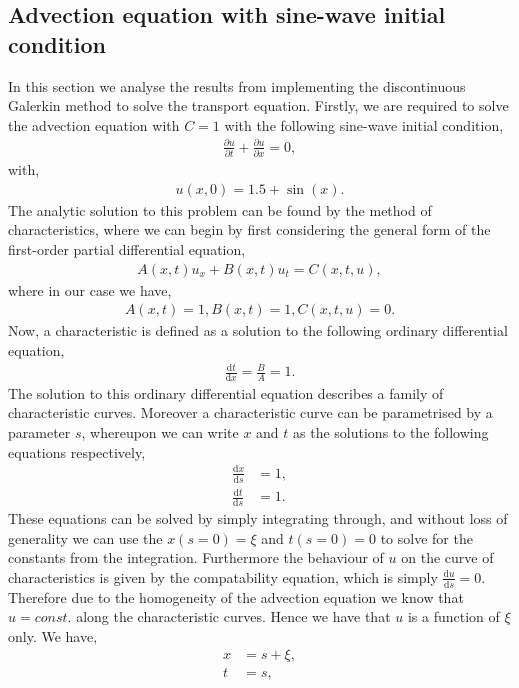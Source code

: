\documentclass[a4paper, 12pt]{article}
\begin{document}
\subsection{Advection equation with sine-wave initial condition} 
In this section we analyse the results from implementing the discontinuous Galerkin method to solve the transport equation. Firstly, we are required to solve the advection equation with $C=1$ with the following sine-wave initial condition,
\begin{align*}
\frac{\partial u}{\partial t} + \frac{\partial u}{\partial x} = 0,
\end{align*}
with, 
\begin{align*}
u(x,0) = 1.5 + \sin(x). 
\end{align*}   
The analytic solution to this problem can be found by the method of characteristics, where we can begin by first considering the general form of the first-order partial differential equation,
\begin{align*}
A(x,t)u_x + B(x,t)u_t = C(x,t,u), 
\end{align*}
where in our case we have, 
\begin{align*}
A(x,t) = 1, B(x,t) = 1, C(x,t,u) = 0. 
\end{align*}
Now, a characteristic is defined as a solution to the following ordinary differential equation,
\begin{align*}
\frac{\mathrm{d}t}{\mathrm{d}x} = \frac{B}{A} = 1.
\end{align*} 
The solution to this ordinary differential equation describes a family of characteristic curves. Moreover a characteristic curve can be parametrised by a parameter $s$, whereupon we can write $x$ and $t$ as the solutions to the following equations respectively,
\begin{align*}
\frac{\mathrm{d}x}{\mathrm{d}s} &= 1,\\
 \frac{\mathrm{d}t}{\mathrm{d}s} &= 1.
\end{align*}
These equations can be solved by simply integrating through, and without loss of generality we can use the $x(s=0)=\xi$ and $t(s=0)=0$ to solve for the constants from the integration. Furthermore the behaviour of $u$ on the curve of characteristics is given by the compatability equation, which is simply $\frac{\mathrm{d}u}{\mathrm{d}s} = 0$. Therefore due to the homogeneity of the advection equation we know that $u=const.$ along the characteristic curves. Hence we have that $u$ is a function of $\xi$ only. We have,
\begin{align*}
x &= s + \xi,\\
t &= s,
\end{align*}
\end{document}
